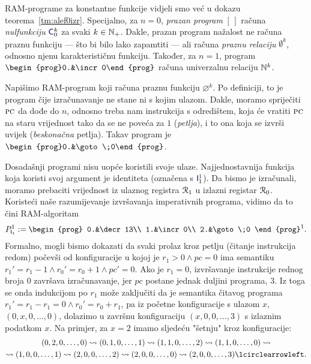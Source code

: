 
RAM-programe za konstantne funkcije vidjeli smo već u dokazu teorema~\ref{tm:alef0izr}. Specijalno, za $n=0$, \emph{prazan program} $[\,]$ računa \emph{nulfunkciju} $\f{C}_0^k$ za svaki $k\in{\mathbb N}_+$. Dakle, prazan program nažalost ne računa praznu funkciju --- što bi bilo lako zapamtiti --- ali računa \emph{praznu relaciju} $\emptyset^k$, odnosno njenu karakterističnu funkciju. Također, za $n=1$, program $\begin{prog}0.&\incr0\end{prog}$ računa univerzalnu relaciju ${\mathbb N}^k$.

Napišimo RAM-program koji računa praznu funkciju $\varnothing^k$. Po definiciji, to je program čije izračunavanje ne stane ni s kojim ulazom. %
Dakle, moramo spriječiti $\textsc{pc}$ da dođe do $n$, odnosno treba nam instrukcija s odredištem, koja će vratiti $\textsc{pc}$ na staru vrijednost tako da se ne poveća za $1$ (\emph{petlja}), i to ona koja se izvrši uvijek (\emph{beskonačna} petlja). Takav program je $\begin{prog}0.&\goto\;0\end{prog}$.

Dosadašnji programi nisu uopće koristili svoje ulaze. Najjednostavnija funkcija koja koristi svoj argument je identiteta (označena s $\f I_1^1$). Da bismo je izračunali, moramo prebaciti vrijednost iz ulaznog registra $\mathcal R_{1}$ u izlazni registar $\mathcal R_{0}$. Koristeći naše razumijevanje izvršavanja imperativnih programa, vidimo da to čini RAM-algoritam
\begin{equation}\label{eq:RAMid}
    P_{\f I_1}^1:=\begin{prog}
        0.&\decr13\\
        1.&\incr0\\
        2.&\goto\;0
    \end{prog}^1\text.
\end{equation}
Formalno, mogli bismo dokazati da svaki prolaz kroz petlju (čitanje instrukcija redom) počevši od konfiguracije u kojoj je $r_1>0\land pc=0$ ima semantiku $r_1'=r_1-1\land r_0'=r_0+1\land pc'=0$. Ako je $r_1=0$, izvršavanje instrukcije rednog broja $0$ završava izračunavanje, jer $pc$ postane jednak duljini programa, $3$. Iz toga se onda indukcijom po $r_1$ može zaključiti da je semantika čitavog programa $r_1'=r_1-r_1=0\land r_0'=r_0+r_1$, pa iz početne konfiguracije s ulazom $x$, $(0,x,0,\dotsc,0)$, dolazimo u završnu konfiguraciju $(x,0,0,\dotsc,3)$ s izlaznim podatkom $x$. Na primjer, za $x=2$ imamo sljedeću "šetnju" kroz konfiguracije:
\begin{multline}
    (0,2,0,\dotsc,0)\leadsto
    (0,1,0,\dotsc,1)\leadsto
    (1,1,0,\dotsc,2)\leadsto
    (1,1,0,\dotsc,0)\leadsto\\
    \leadsto(1,0,0,\dotsc,1)\leadsto
    (2,0,0,\dotsc,2)\leadsto
    (2,0,0,\dotsc,0)\leadsto
    (2,0,0,\dotsc,3)\lcirclearrowleft\text.
\end{multline}

